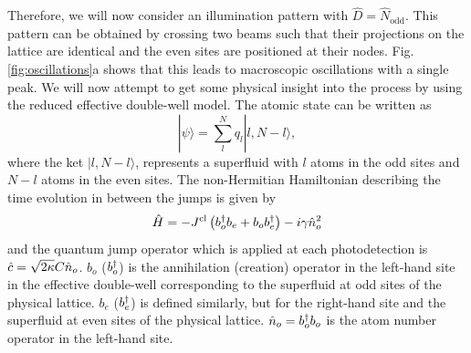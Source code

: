 Therefore, we will now consider an illumination pattern with
$\hat{D} = \hat{N}_\mathrm{odd}$. This pattern can be obtained by
crossing two beams such that their projections on the lattice are
identical and the even sites are positioned at their
nodes. Fig. \ref{fig:oscillations}a shows that this leads to
macroscopic oscillations with a single peak. We will now attempt to
get some physical insight into the process by using the reduced
effective double-well model. The atomic state can be written as 
\begin{equation}
  \label{eq:discretepsi}
  | \psi \rangle = \sum_l^N q_l |l, N - l \rangle,
\end{equation}
where the ket $| l, N - l \rangle$, represents a superfluid with $l$
atoms in the odd sites and $N-l$ atoms in the even sites. The
non-Hermitian Hamiltonian describing the time evolution in between the
jumps is given by
\begin{equation}
  \label{eq:doublewell}
  \hat{H} = -J^\mathrm{cl} \left( b^\dagger_o b_e + b_o b^\dagger_e \right) - i
  \gamma \hat{n}_o^2
\end{equation}
and the quantum jump operator which is applied at each photodetection
is $\hat{c} = \sqrt{2 \kappa} C \hat{n}_o$. $b_o$ ($b^\dagger_o$) is the
annihilation (creation) operator in the left-hand site in the
effective double-well corresponding to the superfluid at odd sites of
the physical lattice. $b_e$ ($b^\dagger_e$) is defined similarly, but for
the right-hand site and the superfluid at even sites of the physical
lattice. $\hat{n}_o = b^\dagger_o b_o$ is the atom number operator in the
left-hand site.


